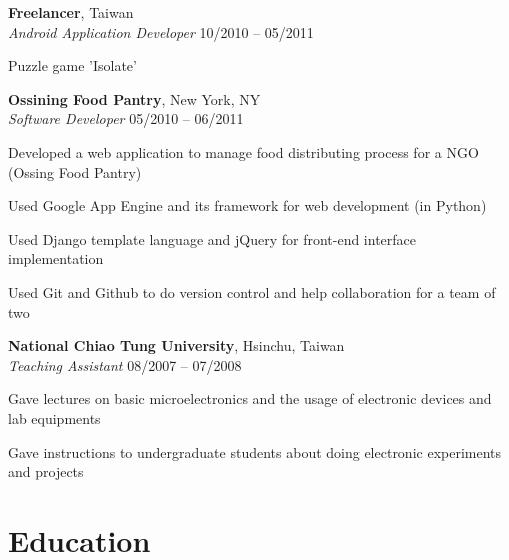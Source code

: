 \documentclass[margin,line]{resume}
\begin{document}
\begin{resume}
    \textbf{Freelancer}, Taiwan \\
    \textsl{Android Application Developer} \hfill 10/2010 -- 05/2011 \vspace{-3mm}\\\vspace{-1mm}%
      \begin{list2}
      \item Puzzle game 'Isolate'
      \end{list2}

    \textbf{Ossining Food Pantry}, New York, NY \\
    \textsl{Software Developer} \hfill 05/2010 -- 06/2011 \vspace{-3mm}\\\vspace{-1mm}%
      \begin{list2}
      \item Developed a web application to manage food distributing process for a NGO (Ossing Food Pantry)
      \item Used Google App Engine and its framework for web development (in Python)
      \item Used Django template language and jQuery for front-end interface implementation
      \item Used Git and Github to do version control and help collaboration for a team of two
      \end{list2}
    
    \textbf{National Chiao Tung University}, Hsinchu, Taiwan \\
    \textsl{Teaching Assistant} \hfill 08/2007 -- 07/2008 \vspace{-3mm}\\\vspace{-1mm}%
      \begin{list2}
      \item Gave lectures on basic microelectronics and the usage of electronic devices and lab equipments
      \item Gave instructions to undergraduate students about doing electronic experiments and projects
      \end{list2}

    \section{\mysidestyle Education}


\end{resume}
\end{document}
